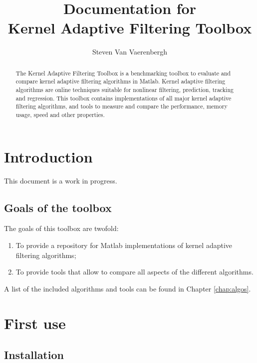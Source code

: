 \documentclass[]{report}
\begin{document}
\title{Documentation for \\Kernel Adaptive Filtering Toolbox}
\author{Steven Van Vaerenbergh}
\maketitle

\begin{abstract}
The Kernel Adaptive Filtering Toolbox is a benchmarking toolbox to evaluate and compare kernel adaptive filtering algorithms in Matlab. Kernel adaptive filtering algorithms are online techniques suitable for nonlinear filtering, prediction, tracking and regression. This toolbox contains implementations of all major kernel adaptive filtering algorithms, and tools to measure and compare the performance, memory usage, speed and other properties.
\end{abstract}


\tableofcontents

\chapter{Introduction}


This document is a work in progress.

\section{Goals of the toolbox}
The goals of this toolbox are twofold:
\begin{enumerate}
\item To provide a repository for Matlab implementations of kernel adaptive filtering algorithms;
\item To provide tools that allow to compare all aspects of the different algorithms.
\end{enumerate}
A list of the included algorithms and tools can be found in Chapter \ref{chap:algos}.


\chapter{First use}

\section{Installation}
\end{document}
